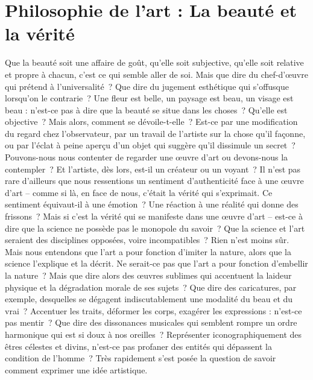 \documentclass[
  10pt,
  french,
  a5paper,
  openany]{book}
\begin{document}

\renewcommand{\chaptermark}[1]{\markboth{\footnotesize\space#1}{}}
\pagestyle{themes}

\hypertarget{philosophie-de-lart-la-beautuxe9-et-la-vuxe9rituxe9}{%
\chapter{Philosophie de l'art : La beauté et la vérité}\label{philosophie-de-lart-la-beautuxe9-et-la-vuxe9rituxe9}}

Que la beauté soit une affaire de goût, qu'elle soit subjective, qu'elle soit relative et propre à chacun, c'est ce qui semble aller de soi. Mais que dire du chef-d'œuvre qui prétend à l'universalité~? Que dire du jugement esthétique qui s'offusque lorsqu'on le contrarie~? Une fleur est belle, un paysage est beau, un visage est beau : n'est-ce pas à dire que la beauté se situe dans les choses~? Qu'elle est objective~? Mais alors, comment se dévoile-t-elle~? Est-ce par une modification du regard chez l'observateur, par un travail de l'artiste sur la chose qu'il façonne, ou par l'éclat à peine aperçu d'un objet qui suggère qu'il dissimule un secret~? Pouvons-nous nous contenter de regarder une œuvre d'art ou devons-nous la contempler~? Et l'artiste, dès lors, est-il un créateur ou un voyant~? Il n'est pas rare d'ailleurs que nous ressentions un sentiment d'authenticité face à une œuvre d'art -- comme si là, en face de nous, c'était la vérité qui s'exprimait. Ce sentiment équivaut-il à une émotion~? Une réaction à une réalité qui donne des frissons~? Mais si c'est la vérité qui se manifeste dans une œuvre d'art -- est-ce à dire que la science ne possède pas le monopole du savoir~? Que la science et l'art seraient des disciplines opposées, voire incompatibles~? Rien n'est moins sûr. Mais nous entendons que l'art a pour fonction d'imiter la nature, alors que la science l'explique et la décrit. Ne serait-ce pas que l'art a pour fonction d'embellir la nature~? Mais que dire alors des œuvres sublimes qui accentuent la laideur physique et la dégradation morale de ses sujets~? Que dire des caricatures, par exemple, desquelles se dégagent indiscutablement une modalité du beau et du vrai~? Accentuer les traits, déformer les corps, exagérer les expressions : n'est-ce pas mentir~? Que dire des dissonances musicales qui semblent rompre un ordre harmonique qui est si doux à nos oreilles~? Représenter iconographiquement des êtres célestes et divins, n'est-ce pas profaner des entités qui dépassent la condition de l'homme~? Très rapidement s'est posée la question de savoir comment exprimer une idée artistique.
\end{document}
